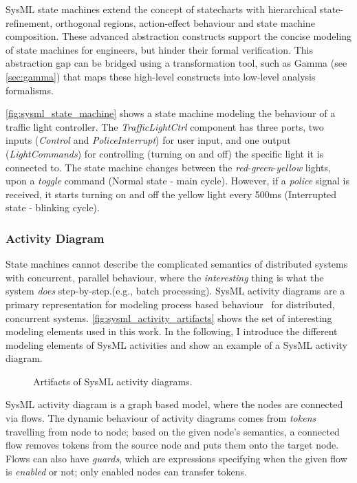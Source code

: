 SysML state machines extend the concept of statecharts with hierarchical state-refinement, orthogonal regions, action-effect behaviour and state machine composition. These advanced abstraction constructs support the concise modeling of state machines for engineers, but hinder their formal verification. This abstraction gap can be bridged using a transformation tool, such as Gamma (see \autoref{sec:gamma}) that maps these high-level constructs into low-level analysis formalisms. 

\autoref{fig:sysml_state_machine} shows a state machine modeling the behaviour of a traffic light controller. The \emph{TrafficLightCtrl} component has three ports, two inputs (\emph{Control} and \emph{PoliceInterrupt}) for user input, and one output (\emph{LightCommands}) for controlling (turning on and off) the specific light it is connected to. The state machine changes between the \emph{red}-\emph{green}-\emph{yellow} lights, upon a \emph{toggle} command (Normal state - main cycle). However, if a \emph{police} signal is received, it starts turning on and off the yellow light every 500ms (Interrupted state - blinking cycle).

\subsubsection*{Activity Diagram}\label{ssec:sysml_activity}

State machines cannot describe the complicated semantics of distributed systems with concurrent, parallel behaviour, where the \emph{interesting} thing is what the system \emph{does} step-by-step.(e.g., batch processing). SysML activity diagrams are a primary representation for modeling process based behaviour~\cite{omg_sysml} for distributed, concurrent systems. \autoref{fig:sysml_activity_artifacts} shows the set of interesting modeling elements used in this work. In the following, I introduce the different modeling elements of SysML activities and show an example of a SysML activity diagram.

\begin{figure}[!ht]
	\centering
	
	\caption{Artifacts of SysML activity diagrams.}
	\label{fig:sysml_activity_artifacts}
\end{figure}

SysML activity diagram is a graph based model, where the nodes are connected via flows. The dynamic behaviour of activity diagrams comes from \emph{tokens} travelling from node to node; based on the given node's semantics, a connected flow removes tokens from the source node and puts them onto the target node. Flows can also have \emph{guards}, which are expressions specifying when the given flow is \emph{enabled} or not; only enabled nodes can transfer tokens.

